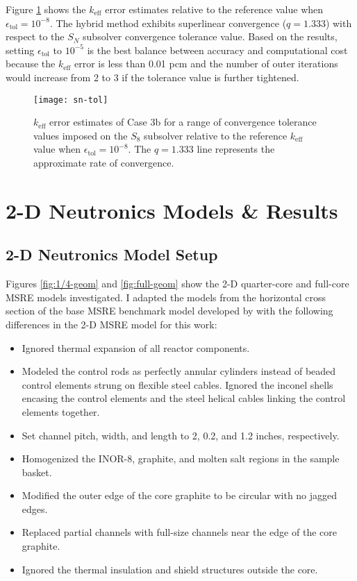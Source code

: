 Figure \ref{fig:sn-tol} shows the $k_\text{eff}$ error estimates relative to the reference value
when $\epsilon_\text{tol}=10^{-8}$. The hybrid method exhibits superlinear convergence ($q=1.333$)
with respect to the $S_N$ subsolver convergence tolerance value. Based on the results, setting
$\epsilon_\text{tol}$ to $10^{-5}$ is the best balance between accuracy and computational
cost because the $k_\text{eff}$ error is less than 0.01 pcm and the number of outer iterations
would increase from 2 to 3 if the tolerance value is further tightened.

\begin{figure}[htb!]
  \centering
  \texttt{[image: sn-tol]}
  \caption{$k_\text{eff}$ error estimates of Case 3b for a range of convergence tolerance values
  imposed on the $S_8$ subsolver relative to the reference $k_\text{eff}$ value when
  $\epsilon_\text{tol}=10^{-8}$. The $q=1.333$ line represents the approximate rate of
  convergence.}
  \label{fig:sn-tol}
\end{figure}

\section{2-D Neutronics Models \& Results} \label{sec:2d-results}

\subsection{2-D Neutronics Model Setup} \label{sec:2d-model-setup}

Figures \ref{fig:1/4-geom} and \ref{fig:full-geom} show the 2-D quarter-core and full-core
\gls{MSRE} models investigated. I adapted the models from the horizontal cross section of the base
\gls{MSRE} benchmark model developed by \cite{fratoni_molten_2020} with the following differences
in the 2-D \gls{MSRE} model for this work:

\begin{itemize}
  \item Ignored thermal expansion of all reactor components.
  \item Modeled the control rods as perfectly annular cylinders instead of beaded control elements
    strung on flexible steel cables. Ignored the inconel shells encasing the control elements and
    the steel helical cables linking the control elements together.
  \item Set channel pitch, width, and length to 2, 0.2, and 1.2 inches, respectively.
  \item Homogenized the INOR-8, graphite, and molten salt regions in the sample basket.
  \item Modified the outer edge of the core graphite to be circular with no jagged edges.
  \item Replaced partial channels with full-size channels near the edge of the core graphite.
  \item Ignored the thermal insulation and shield structures outside the core.
\end{itemize}

